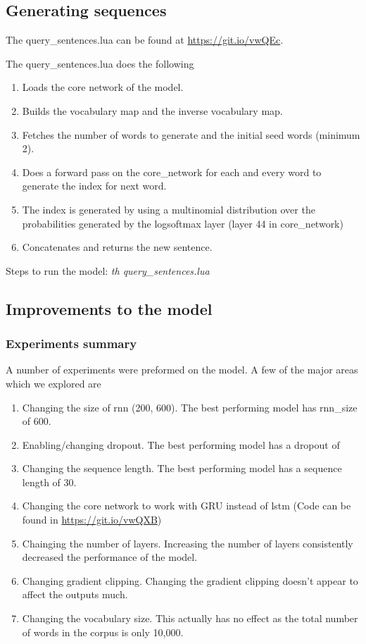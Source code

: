 \documentclass{article}
\begin{document}
\subsection{Generating sequences}
The query\_sentences.lua can be found at \url{https://git.io/vwQEc}.

The query\_sentences.lua does the following
\begin{enumerate}
  \item Loads the core network of the model.
  \item Builds the vocabulary map and the inverse vocabulary map.
  \item Fetches the number of words to generate and the initial seed words (minimum 2).
  \item Does a forward pass on the core\_network for each and every word to generate the index for next word.
  \item The index is generated by using a multinomial distribution over the probabilities generated by the logsoftmax layer (layer 44 in core\_network)
  \item Concatenates and returns the new sentence.
\end{enumerate}

Steps to run the model:  \textit{th query\_sentences.lua}

\subsection{Improvements to the model}
\subsubsection{Experiments summary}
A number of experiments were preformed on the model.  A few of the major areas which we explored are
\begin{enumerate}
  \item Changing the size of rnn (200, 600).  The best performing model has rnn\_size of 600.
  \item Enabling/changing dropout.  The best performing model has a dropout of 
  \item Changing the sequence length.  The best performing model has a sequence length of 30.
  \item Changing the core network to work with GRU instead of lstm (Code can be found in \url{https://git.io/vwQXB})
  \item Chainging the number of layers.  Increasing the number of layers consistently decreased the performance of the model.
  \item Changing gradient clipping.  Changing the gradient clipping doesn't appear to affect the outputs much.
  \item Changing the vocabulary size.  This actually has no effect as the total number of words in the corpus is only 10,000.
\end{enumerate}
\end{document}
